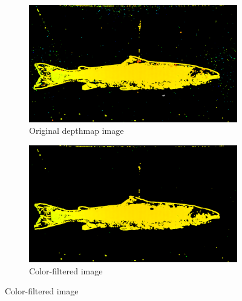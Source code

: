 \begin{figure}[H]
    \begin{subfigure}{0.49\textwidth}
        \includegraphics[width=\linewidth]{images/implementation/1_original}
        \caption{Original depthmap image} 
        \label{fig:original_depthmap}
    \end{subfigure}\hspace*{\fill}
    \begin{subfigure}{0.49\textwidth}
        \includegraphics[width=\linewidth]{images/implementation/2_color_filtering}
        \caption{Color-filtered image} 
        \label{fig:color_filtering}
    \end{subfigure}
    

\end{figure}
